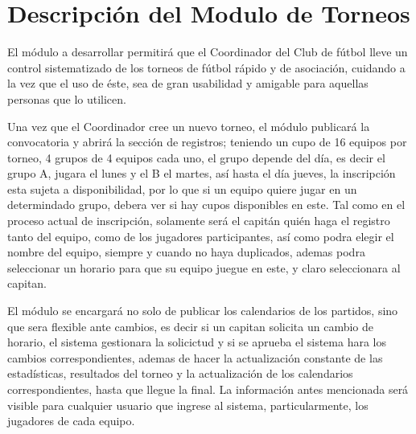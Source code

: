 \section{Descripción del Modulo de Torneos}

\begin{description}

\item El módulo a desarrollar permitirá que el Coordinador del Club de fútbol lleve un control sistematizado de los torneos de fútbol rápido y de asociación, cuidando a la vez que el uso de éste, sea de gran usabilidad y amigable para aquellas personas que lo utilicen.

Una vez que el Coordinador cree un nuevo torneo, el módulo publicará la convocatoria y abrirá la sección de registros; teniendo un cupo de 16 equipos por torneo, 4 grupos de 4 equipos cada uno, el grupo depende del día, es decir el grupo A, jugara el lunes y el B el martes, así hasta el día jueves, la inscripción esta sujeta a disponibilidad, por lo que si un equipo quiere jugar en un determindado grupo, debera ver si hay cupos disponibles en este. Tal como en el proceso actual de inscripción, solamente será el capitán quién haga el registro tanto del equipo, como de los jugadores participantes, así como podra elegir el nombre del equipo, siempre y cuando no haya duplicados, ademas podra seleccionar un horario para que su equipo juegue en este, y claro seleccionara al capitan. 

El módulo se encargará no solo de publicar los calendarios de los partidos, sino que sera flexible ante cambios, es decir si un capitan solicita un cambio de horario, el sistema gestionara la solicictud y si se aprueba el sistema hara los cambios correspondientes, ademas de hacer la actualización constante de las estadísticas, resultados del torneo y la actualización de los calendarios correspondientes, hasta que llegue la final. La información antes mencionada será visible para cualquier usuario que ingrese al sistema, particularmente, los jugadores de cada equipo. 

\end{description}

